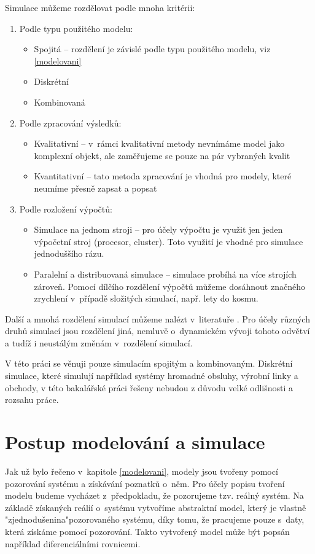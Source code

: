 Simulace můžeme rozdělovat podle mnoha kritérii:
\begin{enumerate}
    \item Podle typu použitého modelu:
        \begin{itemize}
            \item Spojitá -- rozdělení je závislé podle typu použitého modelu, viz \ref{modelovani}
            \item Diskrétní
            \item Kombinovaná
        \end{itemize}
    \item Podle zpracování výsledků:
        \begin{itemize}
            \item Kvalitativní -- v~rámci kvalitativní metody nevnímáme model jako komplexní objekt, ale zaměřujeme se pouze na pár vybraných kvalit
            \item Kvantitativní -- tato metoda zpracování je vhodná pro modely, které neumíme přesně zapsat a popsat
        \end{itemize}
    \item Podle rozložení výpočtů:
        \begin{itemize}
            \item Simulace na jednom stroji -- pro účely výpočtu je využit jen jeden výpočetní stroj (procesor, cluster). Toto využití je vhodné pro simulace jednoduššího rázu.
            \item Paralelní a distribuovaná simulace -- simulace probíhá na více strojích zároveň. Pomocí dílčího rozdělení výpočtů můžeme dosáhnout značného zrychlení v~případě složitých simulací, např. lety do kosmu.
        \end{itemize}
\end{enumerate}
Další a mnohá rozdělení simulací můžeme nalézt v~literatuře \cite{IMS-skripta}. Pro účely různých druhů simulací jsou rozdělení jiná, nemluvě o~dynamickém vývoji tohoto odvětví a tudíž i neustálým změnám v~rozdělení simulací.

V této práci se věnuji pouze simulacím spojitým a kombinovaným. Diskrétní simulace, které simulují například systémy hromadné obsluhy, výrobní linky a obchody, v této bakalářské práci řešeny nebudou z důvodu velké odlišnosti a rozsahu práce. 

\section{Postup modelování a simulace}
Jak už bylo řečeno v~kapitole \ref{modelovani}, modely jsou tvořeny pomocí pozorování systému a získávání poznatků o~něm. Pro účely popisu tvoření modelu budeme vycházet z~předpokladu, že pozorujeme tzv. reálný systém. Na základě získaných reálií o~systému vytvoříme abstraktní model, který je vlastně "zjednodušenina"\space pozorovaného systému, díky tomu, že pracujeme pouze s~daty, která získáme pomocí pozorování. Takto vytvořený model může být popsán například diferenciálními rovnicemi.

